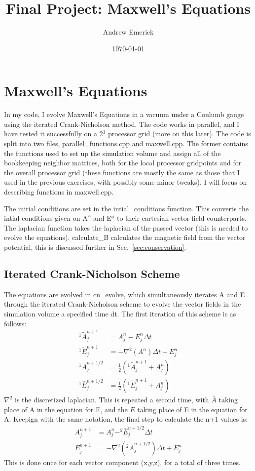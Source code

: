 \documentclass[a4paper]{article}
\date{\today}
\title{Final Project: Maxwell's Equations}
\author{Andrew Emerick}
\begin{document}
\maketitle

\section{Maxwell's Equations}
In my code, I evolve Maxwell's Equations in a vacuum under a Coulumb gauge
using the iterated Crank-Nicholson method. The code works in parallel, and I
have tested it successfully on a 2$^3$ processor grid (more on this later). The
code is split into two files, parallel\_functions.cpp and maxwell.cpp. The
former contains the functions used to set up the simulation volume and assign
all of the bookkeeping neighbor matrices, both for the local processor gridpoints
and for the overall processor grid (these functions are mostly the same as those
that I used in the previous exercises, with possibly some minor tweaks). I will
focus on describing functions in maxwell.cpp.

The initial conditions are set in the intial\_conditions function. This converts
the intial conditions given on A$^{\phi}$ and E$^{\phi}$ to their cartesian
vector field counterparts. The laplacian function takes the laplacian of the 
passed vector (this is needed to evolve the equations). calculate\_B calculates
the magnetic field from the vector potential, this is discussed further in
Sec.~\ref{sec:conservation}. 

\subsection{Iterated Crank-Nicholson Scheme}
The equations are evolved in cn\_evolve, which simultaneously iterates A and E
through the iterated Crank-Nicholson scheme to evolve the vector fields in the 
simulation volume a specified time dt. The first iteration of this scheme is 
as follows:
\begin{align}
^{1}\tilde{A}^{n+1}_j &= A^{n}_j - E^{n}_{j} \Delta t \\
^{1}\tilde{E}^{n+1}_j &= -\nabla^{2}(A^{n})\Delta t + E^{n}_{j} \\
^{1}\bar{A}^{n+1/2}_j &= \frac{1}{2}(^{1}\tilde{A}^{n+1}_j + A^{n}_{j}) \\
^{1}\bar{E}^{n+1/2}_j &= \frac{1}{2}(^{1}\tilde{E}^{n+1}_j + A^{n}_{j}) 
\end{align}
$\nabla^{2}$ is the discretized laplacian. 
This is repeated a second time, with $\bar{A}$ taking place of A in the equation
for E, and the $\bar{E}$ taking place of E in the equation for A. Keepign with 
the same notation, the final step to calculate the n+1 values is:
\begin{align}
A^{n+1}_{j} &= A^{n}_{j} - ^{2}\bar{E}^{n+1/2}_{j} \Delta t \\
E^{n+1}_{j} &= -\nabla^{2}(^{2}\bar{A}^{n+1/2}_{j}) \Delta t + E^{n}_{j} 
\end{align}
This is done once for each vector component (x,y,z), for a total of three 
times.
\end{document}
